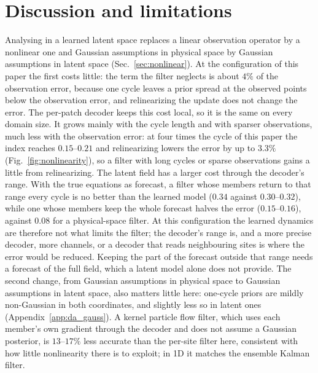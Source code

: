 \section{Discussion and limitations}
\label{sec:discussion}

 Analysing in a learned latent
space replaces a linear observation operator by a nonlinear one and
Gaussian assumptions in physical space by Gaussian assumptions in latent
space (Sec.~\ref{sec:nonlinear}). At the configuration of this paper the
first costs little: the term the filter neglects is about $4\%$ of the
observation error, because one cycle leaves a prior spread at the observed
points below the observation error, and relinearizing the update does
not change the error. The per-patch decoder keeps this cost local, so it is
the same on every domain size. It grows mainly with the cycle length and with sparser observations,
much less with the observation error: at four times the cycle of this paper the index
reaches $0.15$--$0.21$ and relinearizing lowers the error by up to $3.3\%$
(Fig.~\ref{fig:nonlinearity}), so a filter with long cycles or sparse
observations gains a little from relinearizing.
The latent field has a larger cost through the decoder's range. With the
true equations as forecast, a filter whose members return to that range
every cycle is no better than the learned model ($0.34$ against
$0.30$--$0.32$), while one whose members keep the whole forecast halves the
error ($0.15$--$0.16$), against $0.08$ for a physical-space filter. At this
configuration the learned dynamics are therefore not what limits the
filter; the decoder's range is, and a more precise decoder, more channels,
or a decoder that reads neighbouring sites is where the error would be
reduced. Keeping the part of the forecast outside that range needs a
forecast of the full field, which a latent model alone does not provide.
The second change, from Gaussian assumptions in physical space to Gaussian
assumptions in latent space, also matters little here: one-cycle priors are
mildly non-Gaussian in both coordinates, and slightly less so in latent
ones (Appendix~\ref{app:da_gauss}).
A kernel particle flow filter, which uses each member's own gradient through
the decoder and does not assume a Gaussian posterior, is $13$--$17\%$ less
accurate than the per-site filter here, consistent with how little
nonlinearity there is to exploit; in 1D it matches the ensemble Kalman filter.


